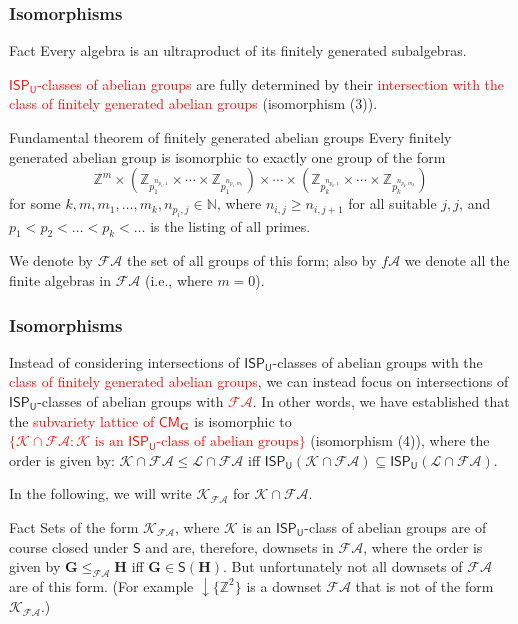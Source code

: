 \documentclass[professionalfont, 10pt]{beamer} %
\theoremstyle{plain}
\theoremstyle{definition}
\newcommand{\m}[1]{{\mathbf {#1} }}
\begin{document}
\begin{frame}
\frametitle{Isomorphisms}
    \begin{block}{Fact}
        Every algebra is an ultraproduct of its finitely generated subalgebras.
    \end{block}
    \textcolor{red}{$\mathsf{ISP_U}$-classes of abelian groups} are fully determined by their \textcolor{red}{intersection with the class of finitely generated abelian groups} (isomorphism (3)).\pause

    \begin{block}{Fundamental theorem of finitely generated abelian groups}
        Every finitely generated abelian group is isomorphic to exactly one group of the form
        \[
            \mathbb{Z}^m \times (\mathbb{Z}_{p_1^{n_{p_1, 1}}} \times \cdots \times \mathbb{Z}_{p_1^{n_{p_1,m_1}}}) \times \cdots \times (\mathbb{Z}_{p_k^{n_{p_k, 1}}} \times \cdots \times \mathbb{Z}_{p_k^{n_{p_k,m_k}}})  
        \]
        for some $k, m, m_1, \dots, m_k,n_{p_i,j} \in \mathbb{N}$, where $n_{i,j} \geq n_{i,j+1}$ for all suitable $j,j$, and $p_1 < p_2< \dots < p_k < \ldots $ is the listing of all primes.
    \end{block}
    We denote by $\mathcal{FA}$ the set of all groups of this form; also by $f\mathcal{A}$ we denote all the finite algebras in $\mathcal{FA}$ (i.e., where $m=0$).
\end{frame}

\begin{frame}
\frametitle{Isomorphisms}
    Instead of considering intersections of $\mathsf{ISP_U}$-classes of abelian groups with the \textcolor{red}{class of finitely generated abelian groups}, we can instead focus on intersections of $\mathsf{ISP_U}$-classes of abelian groups with \textcolor{red}{$\mathcal{FA}$}.\pause
    In other words, we have established that the \textcolor{red}{subvariety lattice of $\mathsf{CM}_{\mathbf{G}}$} is isomorphic to \textcolor{red}{$\{\mathcal{K} \cap \mathcal{FA} : \mathcal{K} \text{ is an } \mathsf{ISP_U} \text{-class of abelian groups}\}$} (isomorphism (4)), where the order is given by: $\mathcal{K} \cap \mathcal{FA} \leq \mathcal{L} \cap \mathcal{FA}$ iff
    $\mathsf{ISP_U}(\mathcal{K} \cap \mathcal{FA}) \subseteq \mathsf{ISP_U}(\mathcal{L} \cap \mathcal{FA})$.

    In the following, we will write $\mathcal{K}_{ \mathcal{FA}}$ for $\mathcal{K} \cap \mathcal{FA}$.\pause
    \begin{block}{Fact}
        Sets of the form $\mathcal{K}_{\mathcal{FA}}$, where $\mathcal{K}$ is an $\mathsf{ISP_U}$-class of abelian groups are of course closed under $\mathsf{S}$ and are, therefore, downsets in $\mathcal{FA}$, where the order is given by $\m G \leq_{\mathcal{FA}} \m H$ iff $\m G \in \mathsf{S}(\m H)$.
        But unfortunately not all downsets of $\mathcal{FA}$ are of this form.
        (For example ${\downarrow} \{\mathbb{Z}^2\}$ is a downset $\mathcal{FA}$ that is not of the form  $\mathcal{K}_{\mathcal{FA}}$.)
    \end{block}
\end{frame}
\end{document}
